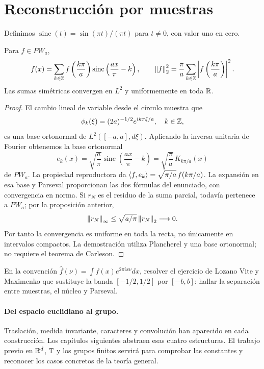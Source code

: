 \section{Reconstrucción por muestras}
Definimos $\operatorname{sinc}(t)=\sin(\pi t)/(\pi t)$ para $t\ne0$, con valor uno en cero.
\begin{teorema}\label{v4:muestreo}
Para $f\in PW_a$,
\[
 f(x)=\sum_{k\in\mathbb Z}f\left(\frac{k\pi}a\right)
 \operatorname{sinc}\left(\frac{ax}\pi-k\right),
 \qquad
 \left\lVert f\right\rVert_2^2=\frac\pi a\sum_{k\in\mathbb Z}\left|f\left(\frac{k\pi}a\right)\right|^2.
\]
Las sumas simétricas convergen en $L^2$ y uniformemente en toda $\mathbb R$.
\end{teorema}
\begin{proof}
El cambio lineal de variable desde el círculo muestra que
\[
 \phi_k(\xi)=(2a)^{-1/2}e^{ik\pi\xi/a},\quad k\in\mathbb Z,
\]
es una base ortonormal de $L^2([-a,a],d\xi)$. Aplicando la inversa unitaria de Fourier obtenemos la base ortonormal
\[
 e_k(x)=\sqrt{\frac a\pi}\operatorname{sinc}\left(\frac{ax}\pi-k\right)
 =\sqrt{\frac\pi a}\,K_{k\pi/a}(x)
\]
de $PW_a$. La propiedad reproductora da $\left\langle f,e_k\right\rangle=\sqrt{\pi/a}\,f(k\pi/a)$. La expansión en esa base y Parseval proporcionan las dos fórmulas del enunciado, con convergencia en norma. Si $r_N$ es el residuo de la suma parcial, todavía pertenece a $PW_a$; por la proposición anterior,
\[
 \left\lVert r_N\right\rVert_\infty\leq\sqrt{a/\pi}\left\lVert r_N\right\rVert_2\longrightarrow0.
\]
Por tanto la convergencia es uniforme en toda la recta, no únicamente en intervalos compactos. La demostración utiliza Plancherel y una base ortonormal; no requiere el teorema de Carleson.
\end{proof}
\begin{ejercicio}\label{ej:v4-ampl-muestreo}
En la convención $\widehat f(\nu)=\int f(x)e^{2\pi ix\nu}dx$, resolver el ejercicio de Lozano Vite y Maximenko que sustituye la banda $[-1/2,1/2]$ por $[-b,b]$: hallar la separación entre muestras, el núcleo y Parseval.
\end{ejercicio}


\paragraph{Del espacio euclidiano al grupo.}
Traslación, medida invariante, caracteres y convolución han aparecido en cada construcción. Los capítulos siguientes abstraen esas cuatro estructuras. El trabajo previo en $\mathbb R^d$, $\mathbb T$ y los grupos finitos servirá para comprobar las constantes y reconocer los casos concretos de la teoría general.

